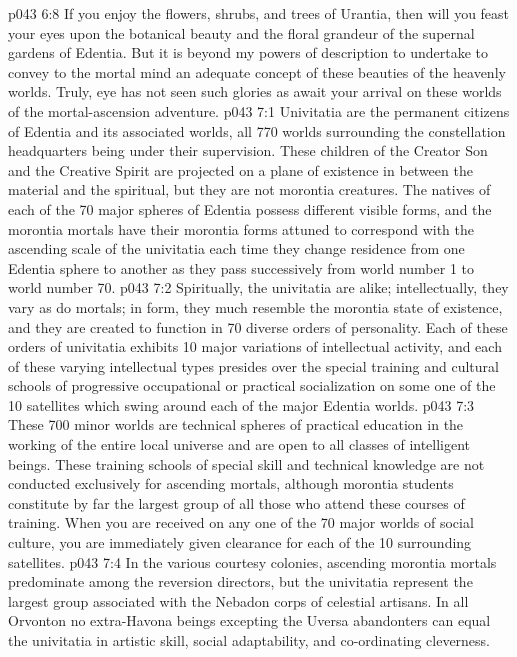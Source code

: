 \vs p043 6:8 If you enjoy the flowers, shrubs, and trees of Urantia, then will you feast your eyes upon the botanical beauty and the floral grandeur of the supernal gardens of Edentia. But it is beyond my powers of description to undertake to convey to the mortal mind an adequate concept of these beauties of the heavenly worlds. Truly, eye has not seen such glories as await your arrival on these worlds of the mortal\hyp{}ascension adventure.
\vs p043 7:1 Univitatia are the permanent citizens of Edentia and its associated worlds, all 770 worlds surrounding the constellation headquarters being under their supervision. These children of the Creator Son and the Creative Spirit are projected on a plane of existence in between the material and the spiritual, but they are not morontia creatures. The natives of each of the 70 major spheres of Edentia possess different visible forms, and the morontia mortals have their morontia forms attuned to correspond with the ascending scale of the univitatia each time they change residence from one Edentia sphere to another as they pass successively from world number 1 to world number 70.
\vs p043 7:2 Spiritually, the univitatia are alike; intellectually, they vary as do mortals; in form, they much resemble the morontia state of existence, and they are created to function in 70 diverse orders of personality. Each of these orders of univitatia exhibits 10 major variations of intellectual activity, and each of these varying intellectual types presides over the special training and cultural schools of progressive occupational or practical socialization on some one of the 10 satellites which swing around each of the major Edentia worlds.
\vs p043 7:3 These 700 minor worlds are technical spheres of practical education in the working of the entire local universe and are open to all classes of intelligent beings. These training schools of special skill and technical knowledge are not conducted exclusively for ascending mortals, although morontia students constitute by far the largest group of all those who attend these courses of training. When you are received on any one of the 70 major worlds of social culture, you are immediately given clearance for each of the 10 surrounding satellites.
\vs p043 7:4 In the various courtesy colonies, ascending morontia mortals predominate among the reversion directors, but the univitatia represent the largest group associated with the Nebadon corps of celestial artisans. In all Orvonton no extra\hyp{}Havona beings excepting the Uversa abandonters can equal the univitatia in artistic skill, social adaptability, and co\hyp{}ordinating cleverness.
